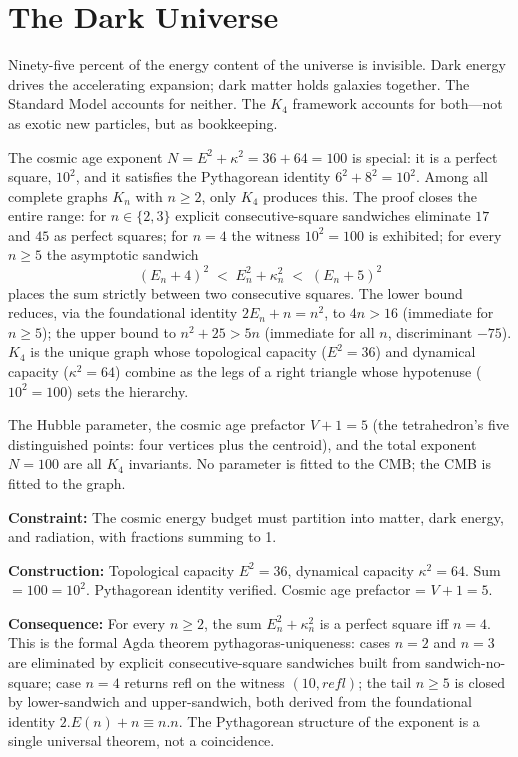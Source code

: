 \documentclass[11pt,a4paper]{book}
\def\cdot{.}%
\def\texttt#1{#1}%
\begin{document}
\chapter{The Dark Universe}
\label{ch:dark-universe}

Ninety-five percent of the energy content of the universe is invisible. Dark energy drives the accelerating expansion; dark matter holds galaxies together. The Standard Model accounts for neither. The $K_4$ framework accounts for both---not as exotic new particles, but as bookkeeping.

The cosmic age exponent $N = E^2 + \kappa^2 = 36 + 64 = 100$ is special: it is a perfect square, $10^2$, and it satisfies the Pythagorean identity $6^2 + 8^2 = 10^2$. Among all complete graphs $K_n$ with $n \geq 2$, only $K_4$ produces this. The proof closes the entire range: for $n \in \{2,3\}$ explicit consecutive-square sandwiches eliminate $17$ and $45$ as perfect squares; for $n = 4$ the witness $10^2 = 100$ is exhibited; for every $n \geq 5$ the asymptotic sandwich
\[
  (E_n + 4)^2 \;<\; E_n^2 + \kappa_n^2 \;<\; (E_n + 5)^2
\]
places the sum strictly between two consecutive squares. The lower bound reduces, via the foundational identity $2 E_n + n = n^2$, to $4n > 16$ (immediate for $n \geq 5$); the upper bound to $n^2 + 25 > 5n$ (immediate for all $n$, discriminant $-75$). $K_4$ is the unique graph whose topological capacity ($E^2 = 36$) and dynamical capacity ($\kappa^2 = 64$) combine as the legs of a right triangle whose hypotenuse ($10^2 = 100$) sets the hierarchy.

The Hubble parameter, the cosmic age prefactor $V + 1 = 5$ (the tetrahedron's five distinguished points: four vertices plus the centroid), and the total exponent $N = 100$ are all $K_4$ invariants. No parameter is fitted to the CMB; the CMB is fitted to the graph.

\textbf{Constraint:} The cosmic energy budget must partition into matter, dark energy, and radiation, with fractions summing to 1.

\textbf{Construction:} Topological capacity $E^2 = 36$, dynamical capacity $\kappa^2 = 64$. Sum $= 100 = 10^2$. Pythagorean identity verified. Cosmic age prefactor = $V + 1 = 5$.

\textbf{Consequence:} For every $n \geq 2$, the sum $E_n^2 + \kappa_n^2$ is a perfect square iff $n = 4$. This is the formal Agda theorem \texttt{pythagoras-uniqueness}: cases $n=2$ and $n=3$ are eliminated by explicit consecutive-square sandwiches built from \texttt{sandwich-no-square}; case $n=4$ returns \texttt{refl} on the witness $(10, \texttt{refl})$; the tail $n \geq 5$ is closed by \texttt{lower-sandwich} and \texttt{upper-sandwich}, both derived from the foundational identity $2 \cdot E(n) + n \equiv n \cdot n$. The Pythagorean structure of the exponent is a single universal theorem, not a coincidence.
\end{document}
